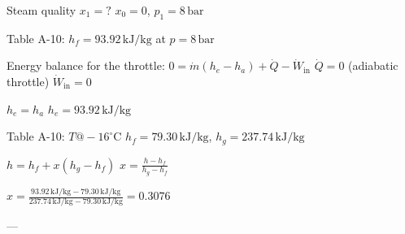 Steam quality \( x_1 = ? \)  
\( x_0 = 0 \), \( p_1 = 8 \, \text{bar} \)  

Table A-10:  
\( h_f = 93.92 \, \text{kJ/kg} \) at \( p = 8 \, \text{bar} \)  

Energy balance for the throttle:  
\( 0 = \dot{m} (h_e - h_a) + \dot{Q} - \dot{W}_{\text{in}} \)  
\( \dot{Q} = 0 \) (adiabatic throttle)  
\( \dot{W}_{\text{in}} = 0 \)  

\( h_e = h_a \)  
\( h_e = 93.92 \, \text{kJ/kg} \)  

Table A-10:  
\( T @ -16^\circ \text{C} \)  
\( h_f = 79.30 \, \text{kJ/kg} \), \( h_g = 237.74 \, \text{kJ/kg} \)  

\( h = h_f + x (h_g - h_f) \)  
\( x = \frac{h - h_f}{h_g - h_f} \)  

\( x = \frac{93.92 \, \text{kJ/kg} - 79.30 \, \text{kJ/kg}}{237.74 \, \text{kJ/kg} - 79.30 \, \text{kJ/kg}} = 0.3076 \)  

---